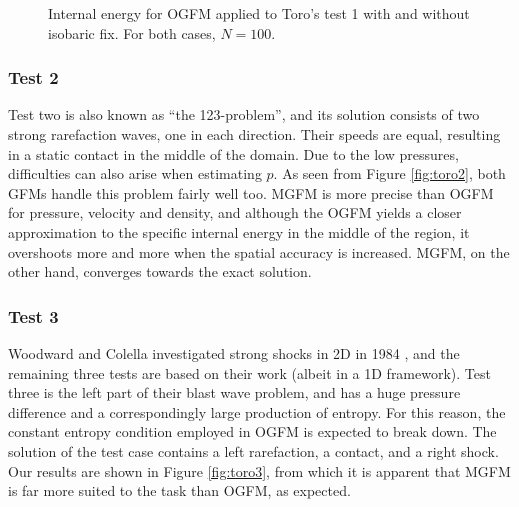 \documentclass[final,3p,twocolumn]{elsarticle}
\begin{document}
\begin{figure}[htb]
    \centering
    \caption[caption]
    {
        Internal energy for OGFM applied to Toro's test 1 with and without isobaric
        fix. For both cases, $N=100$.
    }
    \label{fig:toro1isobarix}
\end{figure}

\subsubsection{Test 2}

Test two is also known as ``the 123-problem'', and its solution consists of two
strong rarefaction waves, one in each direction. Their speeds are equal,
resulting in a static contact in the middle of the domain. Due to the low
pressures, difficulties can also arise when estimating $p$. As seen from
Figure \ref{fig:toro2}, both GFMs handle this problem fairly well too. MGFM
is more precise than OGFM for pressure, velocity and density, and although the
OGFM yields a closer approximation to the specific internal energy in the
middle of the region, it overshoots more and more when the spatial accuracy is
increased. MGFM, on the other hand, converges towards the exact solution. 

\subsubsection{Test 3}

Woodward and Colella investigated strong shocks in 2D in 1984
\cite{woodward1984numerical}, and the remaining three tests are based on their
work (albeit in a 1D framework). Test three is the left part of their blast
wave problem, and has a huge pressure difference and a correspondingly large
production of entropy. For this reason, the constant entropy condition employed
in OGFM is expected to break down. The solution of the test case contains a
left rarefaction, a contact, and a right shock. Our results are shown in
Figure \ref{fig:toro3}, from which it is apparent that MGFM is far more suited
to the task than OGFM, as expected. 
\end{document}
